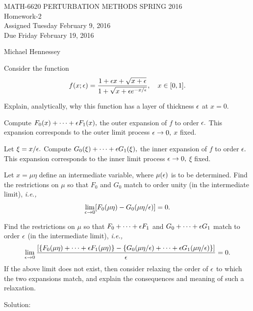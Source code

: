
\pagestyle{empty}


\begin{center}
\large{ MATH-6620 \hspace{1in}  PERTURBATION METHODS \hspace{1in}SPRING 2016\\ Homework-2 \\ Assigned Tuesday February 9, 2016 \\ Due Friday February 19, 2016}\end{center}
\bigskip

Michael Hennessey

\bigskip

 \ec

\benum

\item Consider the function
\begin{equation*}
f(x;\epsilon) = \frac{1+\epsilon x + \sqrt{x+\epsilon}}{1+\sqrt{x+\epsilon e^{-x/\epsilon}}}, \quad x \in [0,1].
\end{equation*}
%
\benum
\item Explain, analytically,  why this function has a layer of thickness
$\epsilon$ at $x=0.$
\item Compute $F_0(x) + \cdots + \epsilon F_1(x) ,$ the outer expansion of $f$ to order $\epsilon.$  This expansion
corresponds to the outer limit process $\epsilon \to 0,$ $x$ fixed.
\item Let $\xi = x/\epsilon.$  Compute $G_0(\xi) + \cdots + \epsilon G_1(\xi),$ the inner expansion of $f$ to order
$\epsilon.$  This expansion corresponds to the inner limit process $\epsilon \to 0,$ $\xi$ fixed.
\item Let $x = \mu \eta$ define an intermediate variable, where $\mu(\epsilon)$ is to be determined.  Find the restrictions on $\mu$ so that $F_0$ and $G_0$ match to order unity (in the intermediate limit), {\it i.e.,}
%
$$\lim_{\epsilon \to 0}[F_0(\mu \eta) - G_0(\mu \eta/\epsilon)] = 0.
$$
%
\item Find the restrictions on $\mu$ so that $F_0 + \cdots + \epsilon F_1$ and $G_0+\cdots + \epsilon G_1$ match to order $\epsilon$ (in the intermediate limit), {\it i.e.,}
%
$$\lim_{\epsilon \to 0}\frac{[\{F_0(\mu \eta) + \cdots + \epsilon F_1(\mu \eta)\}
- \{G_0(\mu \eta/\epsilon) + \cdots + \epsilon G_1(\mu \eta/\epsilon)\}]}{\epsilon} = 0.
$$
%
If the above limit does not exist, then consider relaxing the order of $\epsilon$ to which the two expansions match, and explain the consequences and meaning of such a relaxation.
\eenum

Solution:\\

